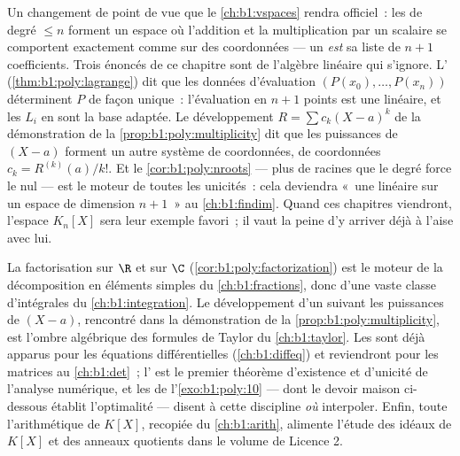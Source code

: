 \begin{remark}\label{rem:b1:poly:interlude}
Un changement de point de vue que le \cref{ch:b1:vspaces} rendra
officiel~: les  de degré $\leq n$ forment un espace où
l'addition et la multiplication par un scalaire se comportent
exactement comme sur des coordonnées --- un  \emph{est} sa
liste de $n + 1$ coefficients. Trois énoncés de ce chapitre sont de
l'algèbre linéaire qui s'ignore. L'
(\cref{thm:b1:poly:lagrange}) dit que les données d'évaluation
$(P(x_0), \dots, P(x_n))$ déterminent $P$ de façon unique~:
l'évaluation en $n + 1$ points est une  linéaire, et les
$L_i$ en sont la base adaptée. Le développement $R = \sum c_k(X -
a)^k$ de la démonstration de la \cref{prop:b1:poly:multiplicity} dit
que les puissances de $(X - a)$ forment un autre système de
coordonnées, de coordonnées $c_k = R^{(k)}(a)/k!$. Et
le \cref{cor:b1:poly:nroots} --- plus de racines que le degré force le
 nul --- est le moteur de toutes les unicités~: cela
deviendra «~une  linéaire  sur un espace de
dimension $n + 1$~» au \cref{ch:b1:findim}. Quand ces chapitres
viendront, l'espace $K_n[X]$ sera leur exemple favori~; il vaut la
peine d'y arriver déjà à l'aise avec lui.
\end{remark}

\begin{remark}\label{rem:b1:poly:whereused}
La factorisation sur $\R$ et sur $\C$
(\cref{cor:b1:poly:factorization}) est le moteur de la décomposition
en éléments simples du \cref{ch:b1:fractions}, donc d'une vaste
classe d'intégrales du \cref{ch:b1:integration}. Le développement
d'un  suivant les puissances de $(X - a)$, rencontré dans la
démonstration de la \cref{prop:b1:poly:multiplicity}, est l'ombre
algébrique des formules de Taylor du \cref{ch:b1:taylor}. Les
 sont déjà apparus pour les équations
différentielles (\cref{ch:b1:diffeq}) et reviendront pour les
matrices au \cref{ch:b1:det}~; l' est le
premier théorème d'existence et d'unicité de l'analyse numérique, et
les  de l'\cref{exo:b1:poly:10} --- dont le
devoir maison ci-dessous établit l'optimalité --- disent à cette
discipline \emph{où} interpoler. Enfin, toute l'arithmétique de
$K[X]$, recopiée du \cref{ch:b1:arith}, alimente l'étude des idéaux
de $K[X]$ et des anneaux quotients dans le volume de Licence 2.
\end{remark}


